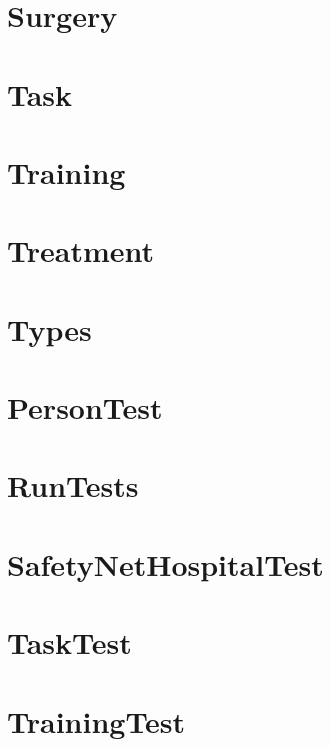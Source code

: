 \documentclass{article}
\begin{document}
\section{Surgery}

\section{Task}

\section{Training}

\section{Treatment}

\section{Types}

\section{PersonTest}

\section{RunTests}

\section{SafetyNetHospitalTest}

\section{TaskTest}

\section{TrainingTest}

\end{document}
